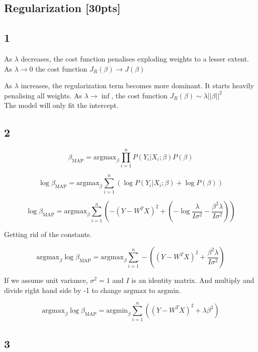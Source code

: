\documentclass[paper=a4, fontsize=11pt]{scrartcl} %
\numberwithin{figure}{section} %
\numberwithin{table}{section} %
\begin{document}
\subsection{Regularization \textbf{[30pts]}}

\subsection*{1}

As $\lambda$ decreases, the cost function penalises exploding weights to a lesser extent.\\
As $\lambda \to 0$ the cost function $J_{R}(\beta) \to J(\beta)$

As $\lambda$ increases, the regularization term becomes more dominant. It starts heavily penalising all weights. 
As $\lambda \to \inf$, the cost function $J_{R}(\beta) \sim \lambda||\beta||^{2}$\\
The model will only fit the intercept. 

\subsection*{2}

$$\beta_{\textrm{MAP}} = \textrm{argmax}_{\beta} \prod_{i = 1}^n P(Y_i | X_i; \beta) P(\beta)$$

$$ \log \beta_{\textrm{MAP}}= \textrm{argmax}_{\beta} \sum_{i=1}^{n}\left( \log P(Y_i | X_i; \beta)+ \log P(\beta)\right)$$

$$ \log \beta_{\textrm{MAP}}= \textrm{argmax}_{\beta} \sum_{i=1}^{n}\left(-(Y-W^{T}X)^{2}+ (-\log \frac{\lambda}{I\sigma^{2}} - \frac{\beta^{2}\lambda}{I\sigma^{2}})\right)$$

Getting rid of the constants.

$$\textrm{argmax}_{\beta}\log \beta_{\textrm{MAP}}=\textrm{argmax}_{\beta} \sum_{i=1}^{n}-\left( (Y-W^{T}X)^{2}+\frac{\beta^{2}\lambda}{I\sigma^{2}}\right)$$

If we assume unit variance, $\sigma^{2}=1$ and $I$ is an identity matrix. And multiply and divide right hand side by -1 to change $\textrm{argmax}$ to $\textrm{argmin}$.

$$\textrm{argmax}_{\beta}\log \beta_{\textrm{MAP}}=\textrm{argmin}_{\beta} \sum_{i=1}^{n}\left( (Y-W^{T}X)^{2}+\lambda\beta^{2}\right)$$

\subsection*{3}
\end{document}
